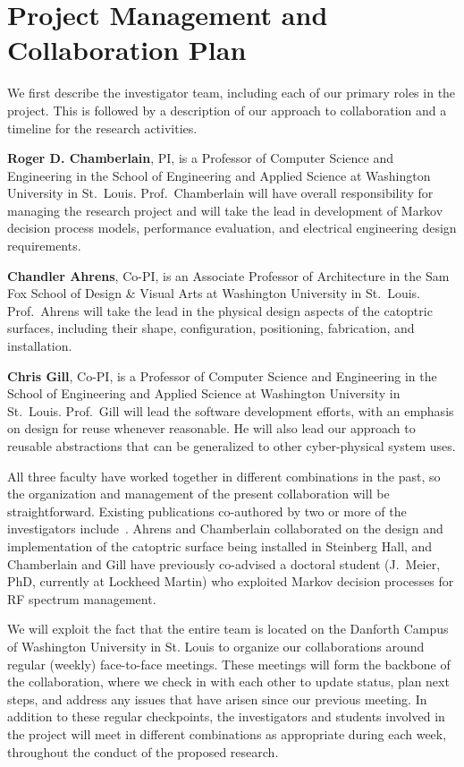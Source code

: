 \section{Project Management and Collaboration Plan}
\label{sec:collab}

We first describe the investigator team, including each of our primary roles
in the project.  This is followed by a description of our approach
to collaboration and a timeline for the research activities.

{\bf Roger D. Chamberlain}, PI, is a Professor of Computer Science
and Engineering in the School of Engineering and Applied Science
at Washington University in St.~Louis.
Prof.~Chamberlain will have overall responsibility for managing the
research project and will take the lead in development of Markov
decision process models, performance evaluation, and electrical engineering
design requirements.

{\bf Chandler Ahrens}, Co-PI, is an Associate Professor of Architecture
in the Sam Fox School of Design \& Visual Arts at Washington University in St.~Louis.
Prof.~Ahrens will take the lead in the physical design aspects of
the catoptric surfaces, including their shape, configuration, positioning,
fabrication, and installation.

{\bf Chris Gill}, Co-PI, is a Professor of Computer Science
and Engineering in the School of Engineering and Applied Science
at Washington University in St.~Louis.
Prof.~Gill will lead the software development efforts, with an emphasis
on design for reuse whenever reasonable.  He will also lead our
approach to reusable abstractions that can be generalized to other
cyber-physical system uses.

All three faculty have worked together in different combinations in the 
past, so the organization and management of the present collaboration 
will be straightforward.  Existing publications co-authored by two or 
more of the investigators include~\cite{cag18,mgc16, mskgct13}. Ahrens 
and Chamberlain collaborated on the design and implementation of the 
catoptric surface being installed in Steinberg Hall, and Chamberlain 
and Gill have previously co-advised a doctoral student (J.~Meier, 
PhD, currently at Lockheed Martin) who exploited Markov decision 
processes for RF spectrum management.

We will exploit the fact that the entire team is located on the
Danforth Campus of Washington University in St. Louis to organize
our collaborations around regular (weekly) face-to-face meetings.  
These meetings will form the backbone of the collaboration, where 
we check in with each other to update status, plan next steps, and 
address any issues that have arisen since our previous meeting.
In addition to these regular checkpoints, the investigators and
students involved in the project will meet in different combinations
as appropriate during each week, throughout the conduct of the 
proposed research.

